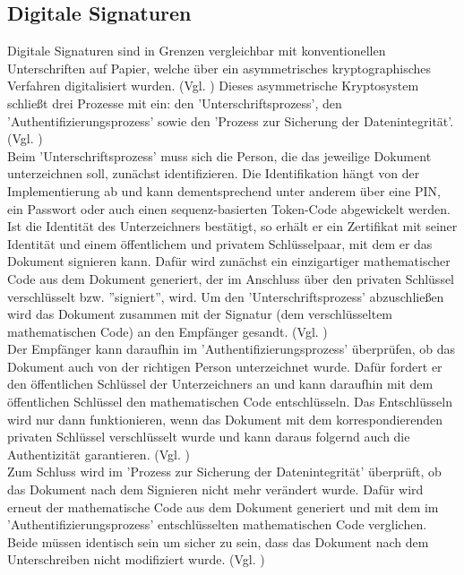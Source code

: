 \documentclass[deutsch]{lib/llncs/llncs}
\begin{document}
\subsection{Digitale Signaturen}
Digitale Signaturen sind in Grenzen vergleichbar mit konventionellen Unterschriften auf Papier, welche über ein asymmetrisches kryptographisches Verfahren digitalisiert wurden. (Vgl. \cite[S. 297]{paar2016kryptografie}) Dieses asymmetrische Kryptosystem schließt drei Prozesse mit ein: den 'Unterschriftsprozess', den 'Authentifizierungsprozess' sowie den 'Prozess zur Sicherung der Datenintegrität'. (Vgl. \cite[S. 4]{arthurdlittle2015digitale}) \\
Beim 'Unterschriftsprozess' muss sich die Person, die das jeweilige Dokument unterzeichnen soll, zunächst identifizieren. Die Identifikation hängt von der Implementierung ab und kann dementsprechend unter anderem über eine PIN, ein Passwort oder auch einen sequenz-basierten Token-Code abgewickelt werden. Ist die Identität des Unterzeichners bestätigt, so erhält er ein Zertifikat mit seiner Identität und einem öffentlichem und privatem Schlüsselpaar, mit dem er das Dokument signieren kann. Dafür wird zunächst ein einzigartiger mathematischer Code aus dem Dokument generiert, der im Anschluss über den privaten Schlüssel verschlüsselt bzw. ''signiert'', wird. Um den 'Unterschriftsprozess' abzuschließen wird das Dokument zusammen mit der Signatur (dem verschlüsseltem mathematischen Code) an den Empfänger gesandt. (Vgl. \cite[S. 4]{arthurdlittle2015digitale}) \\
Der Empfänger kann daraufhin im 'Authentifizierungsprozess' überprüfen, ob das Dokument auch von der richtigen Person unterzeichnet wurde. Dafür fordert er den öffentlichen Schlüssel der Unterzeichners an und kann daraufhin mit dem öffentlichen Schlüssel den mathematischen Code entschlüsseln. Das Entschlüsseln wird nur dann funktionieren, wenn das Dokument mit dem korrespondierenden privaten Schlüssel verschlüsselt wurde und kann daraus folgernd auch die Authentizität garantieren. (Vgl. \cite[S. 4]{arthurdlittle2015digitale}) \\
Zum Schluss wird im 'Prozess zur Sicherung der Datenintegrität' überprüft, ob das Dokument nach dem Signieren nicht mehr verändert wurde. Dafür wird erneut der mathematische Code aus dem Dokument generiert und mit dem im 'Authentifizierungsprozess' entschlüsselten mathematischen Code verglichen. Beide müssen identisch sein um sicher zu sein, dass das Dokument nach dem Unterschreiben nicht modifiziert wurde.  (Vgl. \cite[S. 4]{arthurdlittle2015digitale})
\end{document}
